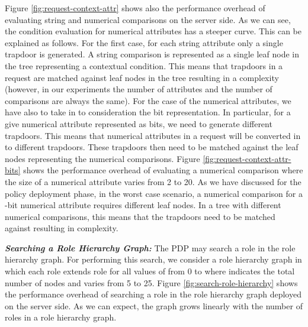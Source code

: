 \documentclass[final,5p,times,twocolumn]{elsarticle}
\begin{document}
Figure \ref{fig:request-context-attr} shows also the performance overhead of evaluating string and numerical comparisons on the server side. As we can see, the condition evaluation for numerical attributes has a steeper curve. This can be explained as follows. For the first case, for each string attribute only a single trapdoor is generated. A string comparison is represented as a single leaf node in the tree representing a contextual condition. This means that  trapdoors in a request are matched against  leaf nodes in the tree resulting in a  complexity (however, in our experiments the number of attributes and the number of comparisons are always the same). For the case of the numerical attributes, we have also to take in to consideration the bit representation. In particular, for a give numerical attribute represented as  bits, we need to generate  different trapdoors. This means that  numerical attributes in a request will be converted in to  different trapdoors. These trapdoors then need to be matched against the leaf nodes representing the numerical comparisons. Figure \ref{fig:request-context-attr-bits} shows the performance overhead of evaluating a numerical comparison where the size of a numerical attribute varies from 2 to 20. As we have discussed for the policy deployment phase, in the worst case scenario, a numerical comparison for a -bit numerical attribute requires  different leaf nodes. In a tree with  different numerical comparisons, this means that the  trapdoors need to be matched against  resulting in  complexity.


\emph{\textbf{Searching a Role Hierarchy Graph:}}
The PDP may search a role in the role hierarchy graph. For performing this search, we consider a role hierarchy graph in which each role  extends role  for all values of  from 0 to  where  indicates the total number of nodes and varies from 5 to 25. Figure \ref{fig:search-role-hierarchy} shows the performance overhead of searching a role in the role hierarchy graph deployed on the server side. As we can expect, the graph grows linearly with the number of roles in a role hierarchy graph.
\end{document}
